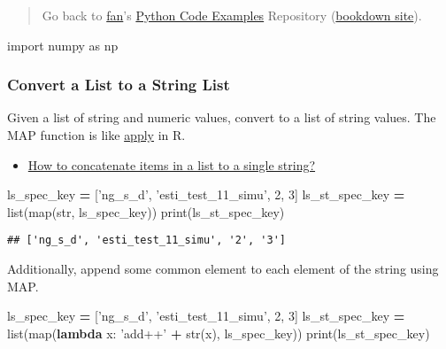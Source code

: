 \documentclass[
]{book}
\newenvironment{Shaded}{\begin{snugshade}}{\end{snugshade}}
\newcommand{\BuiltInTok}[1]{#1}
\newcommand{\DecValTok}[1]{\textcolor[rgb]{0.00,0.00,0.81}{#1}}
\newcommand{\ImportTok}[1]{#1}
\newcommand{\KeywordTok}[1]{\textcolor[rgb]{0.13,0.29,0.53}{\textbf{#1}}}
\newcommand{\NormalTok}[1]{#1}
\newcommand{\OperatorTok}[1]{\textcolor[rgb]{0.81,0.36,0.00}{\textbf{#1}}}
\newcommand{\StringTok}[1]{\textcolor[rgb]{0.31,0.60,0.02}{#1}}
\providecommand{\tightlist}{%
  \setlength{\itemsep}{0pt}\setlength{\parskip}{0pt}}
\begin{document}
\begin{quote}
Go back to \href{http://fanwangecon.github.io/}{fan}'s \href{https://fanwangecon.github.io/pyfan/}{Python Code Examples} Repository (\href{https://fanwangecon.github.io/pyfan/bookdown}{bookdown site}).
\end{quote}

\begin{Shaded}
\begin{Highlighting}[]
\ImportTok{import}\NormalTok{ numpy }\ImportTok{as}\NormalTok{ np}
\end{Highlighting}
\end{Shaded}

\hypertarget{convert-a-list-to-a-string-list}{%
\subsubsection{Convert a List to a String List}\label{convert-a-list-to-a-string-list}}

Given a list of string and numeric values, convert to a list of string values. The MAP function is like \href{https://fanwangecon.github.io/R4Econ/function/noloop/htmlpdfr/fs_apply.html}{apply} in R.

\begin{itemize}
\tightlist
\item
  \href{https://stackoverflow.com/a/34011944/8280804}{How to concatenate items in a list to a single string?}
\end{itemize}

\begin{Shaded}
\begin{Highlighting}[]
\NormalTok{ls_spec_key }\OperatorTok{=}\NormalTok{ [}\StringTok{'ng_s_d'}\NormalTok{, }\StringTok{'esti_test_11_simu'}\NormalTok{, }\DecValTok{2}\NormalTok{, }\DecValTok{3}\NormalTok{]}
\NormalTok{ls_st_spec_key }\OperatorTok{=} \BuiltInTok{list}\NormalTok{(}\BuiltInTok{map}\NormalTok{(}\BuiltInTok{str}\NormalTok{, ls_spec_key))}
\BuiltInTok{print}\NormalTok{(ls_st_spec_key)}
\end{Highlighting}
\end{Shaded}

\begin{verbatim}
## ['ng_s_d', 'esti_test_11_simu', '2', '3']
\end{verbatim}

Additionally, append some common element to each element of the string using MAP.

\begin{Shaded}
\begin{Highlighting}[]
\NormalTok{ls_spec_key }\OperatorTok{=}\NormalTok{ [}\StringTok{'ng_s_d'}\NormalTok{, }\StringTok{'esti_test_11_simu'}\NormalTok{, }\DecValTok{2}\NormalTok{, }\DecValTok{3}\NormalTok{]}
\NormalTok{ls_st_spec_key }\OperatorTok{=} \BuiltInTok{list}\NormalTok{(}\BuiltInTok{map}\NormalTok{(}\KeywordTok{lambda}\NormalTok{ x: }\StringTok{'add++'} \OperatorTok{+} \BuiltInTok{str}\NormalTok{(x), ls_spec_key))}
\BuiltInTok{print}\NormalTok{(ls_st_spec_key)}
\end{Highlighting}
\end{Shaded}
\end{document}
